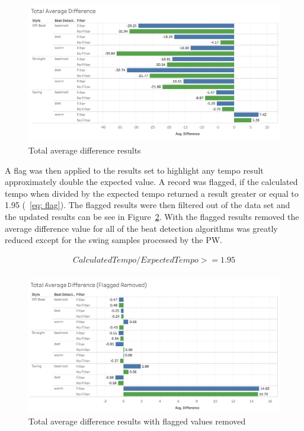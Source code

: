 \documentclass[a4paper, 11pt]{article}
\begin{document}
\begin{figure}[ht]
\centering
\includegraphics[scale=0.25]{images/totAveDiff.jpg}
\caption{Total average difference results}
\label{fig: aveDiff}
\end{figure}

A flag was then applied to the results set to highlight any tempo result approximately double the expected value. A record was flagged, if the calculated tempo when divided by the expected tempo returned a result greater or equal to 1.95 (~\ref{eq: flag}). The flagged results were then filtered out of the data set and the updated results can be see in Figure~\ref{fig: upAveDiff}. With the flagged results removed the average difference value for all of the beat detection algorithms was greatly reduced except for the swing samples processed by the PW. 

\begin{equation}\label{eq: flag}
\begin{split}
Calculated Tempo/Expected Tempo >= 1.95\\
\end{split}
\end{equation}

\begin{figure}[ht]
\centering
\includegraphics[scale=0.25]{images/totAveDiffFR.jpg}
\caption{Total average difference results with flagged values removed}
\label{fig: upAveDiff}
\end{figure}
\end{document}
